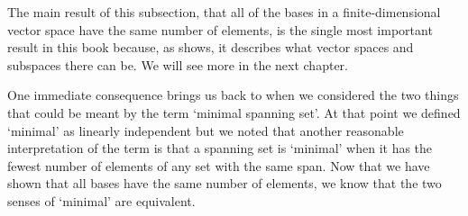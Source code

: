 The main result of this subsection, that all of 
the bases in a finite-dimensional
vector space have the same number of elements, is the single most important
result in this book because, as 
shows, it describes what vector spaces and subspaces there can be.
We will see more in the next chapter.

One immediate consequence brings us 
back to when we considered the two things that could be meant
by the term `minimal spanning set'.
At that point we defined `minimal' as linearly independent
but we noted that 
another reasonable interpretation of the term is  
that a spanning set is `minimal' when it has the fewest
number of elements of any set with the same span.
Now that 
we have shown that all bases have the same number of elements, we know
that the two senses of `minimal' are equivalent.


